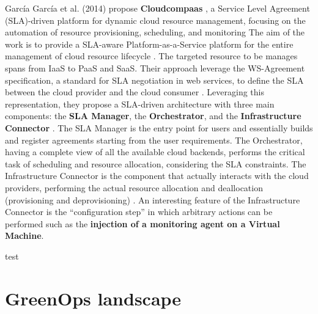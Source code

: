 García García et al. (2014) propose \textbf{Cloudcompaas} \cite{GARCIAGARCIA20141}, a Service Level Agreement (SLA)-driven platform for dynamic cloud resource management, focusing on the automation of resource provisioning, scheduling, and monitoring
The aim of the work is to provide a SLA-aware Platform-as-a-Service platform for the entire management of cloud resource lifecycle \cite{GARCIAGARCIA20141}.
The targeted resource to be manages spans from IaaS to PaaS and SaaS.
Their approach leverage the WS-Agreement specification, a standard for SLA negotiation in web services, to define the SLA between the cloud provider and the cloud consumer \cite{GARCIAGARCIA20141}.
Leveraging this representation, they propose a SLA-driven architecture with three main components: the \textbf{SLA Manager}, the \textbf{Orchestrator}, and the \textbf{Infrastructure Connector} \cite{GARCIAGARCIA20141}.
The SLA Manager is the entry point for users and essentially builds and register agreements starting from the user requirements.
The Orchestrator, having a complete view of all the available cloud backends, performs the critical task of scheduling and resource allocation, considering the SLA constraints.
The Infrastructure Connector is the component that actually interacts with the cloud providers, performing the actual resource allocation and deallocation (provisioning and deprovisioning) \cite{GARCIAGARCIA20141}.
An interesting feature of the Infrastructure Connector is the ``configuration step'' in which arbitrary actions can be performed such as the \textbf{injection of a monitoring agent on a Virtual Machine}.



test
\cite{9499407}







\section{GreenOps landscape}

